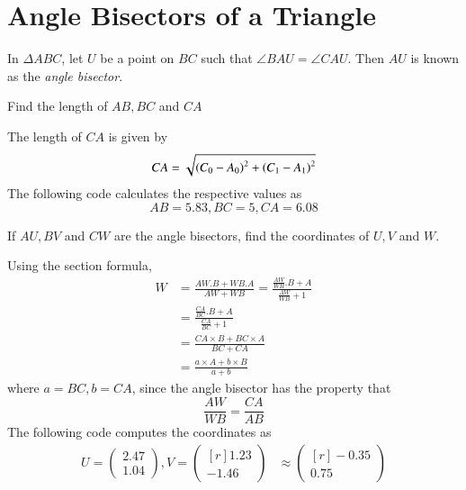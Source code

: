 \documentclass[journal,12pt,twocolumn]{IEEEtran}
\begin{document}
\section{Angle Bisectors of a Triangle}
%
\begin{definition}
In $\Delta ABC$, let $U$ be a point on $BC$ such that $\angle BAU = \angle CAU$. Then $AU$ is known as the {\em angle bisector}.
\end{definition}
\begin{problem}
Find the length of $AB,BC$ and $CA$
\end{problem}
\solution The length of $CA$ is given by
\begin{align}
CA = \sqrt{\left(C_0-A_0\right)^2 + \left(C_1 - A_1\right)^2}
\end{align}
The following code calculates the respective values as
%
\begin{equation}
AB =  5.83, BC =  5, CA =  6.08
\end{equation}
%

\begin{problem}
If $AU,BV$ and $CW$ are the angle bisectors, find the coordinates of $U,V$ and $W$.
\end{problem}
\solution Using the section formula,
\begin{align}
W &= \frac{AW.B+WB.A}{AW + WB} = \frac{\frac{AW}{WB}.B+A}{\frac{AW}{WB} + 1}
\\
&= \frac{\frac{CA}{BC}.B+A}{\frac{CA}{BC} + 1}
\\
&= \frac{{CA}\times B+{BC}\times A}{{BC} + {CA}}
\\
&= \frac{a\times A + b\times B}{a + b}
\end{align}
where $a = BC, b = CA$, 
since the angle bisector has the property that
%
\begin{equation}
\frac{AW}{WB} = \frac{CA}{AB}
\end{equation}
%
The following code computes the coordinates as
\begin{align}
U=
\begin{pmatrix}
2.47
\\
1.04
\end{pmatrix},
V =
\begin{pmatrix*}[r]
1.23
\\
-1.46
\end{pmatrix*}
& \approx 
\begin{pmatrix*}[r]
-0.35
\\
0.75
\end{pmatrix*} 
\end{align}
\end{document}
